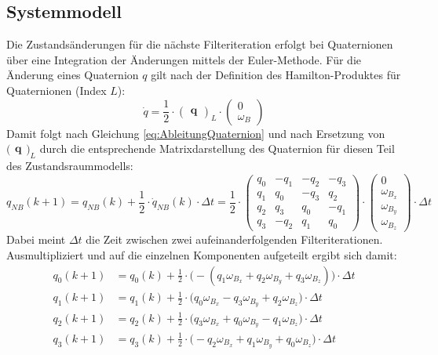 \documentclass[12pt,a4paper]{article}
\begin{document}
		\subsection{Systemmodell}\label{subsec:Systemmodell}
		Die Zustandsänderungen für die nächste Filteriteration erfolgt bei Quaternionen über eine Integration der Änderungen mittels der Euler-Methode. Für die Änderung eines Quaternion $q$ gilt nach der Definition des Hamilton-Produktes für Quaternionen (Index $L$):
		\begin{equation}\label{eq:AbleitungQuaternion}
			\dot q =\frac{1}{2}\cdot \begin{pmatrix}\textbf{q}\end{pmatrix}_{L}\cdot \begin{pmatrix}0\\\omega_{B}\end{pmatrix}
		\end{equation}
		Damit folgt nach Gleichung \ref{eq:AbleitungQuaternion} und nach Ersetzung von $\big(\begin{smallmatrix*}
		\textbf{q}
		\end{smallmatrix*}\big)_{L}$ durch die entsprechende Matrixdarstellung des Quaternion für diesen Teil des Zustandsraummodells:
		\begin{equation}\label{eq:ZustandsgleichungQuaternionAllgemein}
			q_{NB}(k+1)=q_{NB}(k)+\frac{1}{2}\cdot \dot{q}_{NB}(k)\cdot \Delta t=\frac{1}{2}\cdot \begin{pmatrix}
			q_{0 }& -q_{1} & -q_{2} & -q_{3} \\
			q_{1 }& q_{0} & -q_{3} & q_{2} \\
			q_{2} & q_{3} & q_{0} & -q_{1} \\
			q_{3} & -q_{2} & q_{1} & q_{0}
			\end{pmatrix}\cdot
			\begin{pmatrix}
			0\\
			\omega_{B_{x}}\\
			\omega_{B_{y}}\\
			\omega_{B_{z}}
			\end{pmatrix}\cdot \Delta t
		\end{equation}
		Dabei meint $\Delta t$ die Zeit zwischen zwei aufeinanderfolgenden Filteriterationen. Ausmultipliziert und auf die einzelnen Komponenten aufgeteilt ergibt sich damit:
		\begin{align}\label{eq:ZustandsgleichungQuaternionSpeziell}
			q_{0}(k+1)&=q_{0}(k)+\frac{1}{2}\cdot \big(-(q_{1}\omega_{B_{x}}+q_{2}\omega_{B_{y}}+q_{3}\omega_{B_{z}})\big)\cdot \Delta t\\
			q_{1}(k+1)&=q_{1}(k)+\frac{1}{2}\cdot \big(q_{0}\omega_{B_{x}}-q_{3}\omega_{B_{y}}+q_{2}\omega_{B_{z}}\big)\cdot \Delta t\\
			q_{2}(k+1)&=q_{2}(k)+\frac{1}{2}\cdot \big(q_{3}\omega_{B_{x}}+q_{0}\omega_{B_{y}}-q_{1}\omega_{B_{z}}\big)\cdot \Delta t\\
			q_{3}(k+1)&=q_{3}(k)+\frac{1}{2}\cdot \big(-q_{2}\omega_{B_{x}}+q_{1}\omega_{B_{y}}+q_{0}\omega_{B_{z}}\big)\cdot \Delta t
		\end{align}
\end{document}

